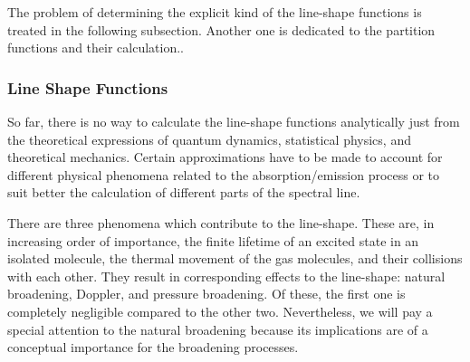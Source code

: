 The problem of determining the explicit kind of the line-shape
functions is treated in the following subsection. Another one is
dedicated to the partition functions and their calculation..


\subsubsection{Line Shape Functions} So far, there is no way to calculate
the line-shape functions analytically just from the theoretical
expressions of quantum dynamics, statistical physics, and theoretical
mechanics. Certain approximations have to be made to account for
different physical phenomena related to the absorption/emission
process or to suit better the calculation of different parts of the
spectral line.

There are three phenomena which contribute to the line-shape. These
are, in increasing order of importance, the finite lifetime of an
excited state in an isolated molecule, the thermal movement of the gas
molecules, and their collisions with each other. They result in
corresponding effects to the line-shape: natural broadening, Doppler,
and pressure broadening. Of these, the first one is completely
negligible compared to the other two. Nevertheless, we will pay a
special attention to the natural broadening because its implications
are of a conceptual importance for the broadening processes.

